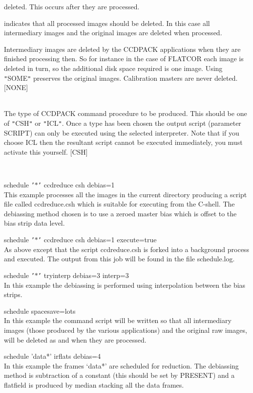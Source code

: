 \documentclass[twoside,11pt]{article}
\newcommand{\htmlref}[2]{#1}
\renewcommand{\_}{\texttt{\symbol{95}}}
\newcommand{\qt}[1]{{\tt "}#1{\tt "}}
\newcommand{\qs}[1]{{\tt '}#1{\tt '}}
\newcommand{\xroutine}[1]{\htmlref{{\sc #1}}{#1}}
\newcommand{\sstexamples}[1]{
   \item[Examples:] \mbox{} \\
   \vspace{-3.5ex}
   \begin{description}
      #1
   \end{description}
}
\newcommand{\sstsubsection}[1]{ \item[{#1}] \mbox{} \\}
\newcommand{\sstexamplesubsection}[2]{\sloppy \item{\ssttt #1} \mbox{} \\ #2 }
\newcommand{\sstexamples}[1]{
      \item[Examples:] \\
      \begin{description}
         #1
      \end{description}
      \\
   }
\newcommand{\sstsubsection}[1]{\item[{#1}]}
\newcommand{\sstexamplesubsection}[2]{\item[{\ssttt #1}] #2}
\begin{document}
{{{\begin{description}
                   deleted. This occurs after they are processed.
            \item[\qt{LOTS}] indicates that all processed images should be deleted.
                   In this case all intermediary images and the original
                   images are deleted when processed.
         \end{description}
         Intermediary images are deleted by the CCDPACK applications when
         they are finished processing then. So for instance in the case
         of \xroutine{FLATCOR} each image is deleted in turn, so the additional disk
         space required is one image. Using \qt{SOME} preserves the original
         images. Calibration masters are never deleted.
         [NONE]
      }
      \sstsubsection{
         STYPE = LITERAL (Read)
      }{
         The type of CCDPACK command procedure to be produced. This
         should be one of \qt{CSH} or \qt{ICL}. Once a type has been
         chosen the output script (parameter SCRIPT) can only be
         executed using the selected interpreter. Note that if you
         choose ICL then the resultant script cannot be executed
         immediately, you must activate this yourself.
         [CSH]
      }
   }
   \sstexamples{
      \sstexamplesubsection{
         schedule \qs{$*$} ccdreduce csh debias=1
      }{
         This example processes all the images in the current directory
         producing a script file called ccdreduce.csh which is suitable
         for executing from the C-shell. The debiassing method chosen is
         to use a zeroed master bias which is offset to the bias strip
         data level.
      }
      \sstexamplesubsection{
         schedule \qs{$*$} ccdreduce csh debias=1 execute=true
      }{
         As above except that the script ccdreduce.csh is forked into a
         background process and executed. The output from this job will
         be found in the file schedule.log.
      }
      \sstexamplesubsection{
         schedule \qs{$*$} tryinterp debias=3 interp=3
      }{
         In this example the debiassing is performed using interpolation
         between the bias strips.
      }
      \sstexamplesubsection{
         schedule spacesave=lots
      }{
         In this example the command script will be written so that all
         intermediary images (those produced by the various applications)
         and the original raw images, will be deleted as and when they are
         processed.
      }
      \sstexamplesubsection{
         schedule 'data*' irflats debias=4
      } {
         In this example the frames `data*' are scheduled for reduction.
         The debiassing method is subtraction of a constant (this should
         be set by \xroutine{PRESENT}) and a flatfield is produced by
         median stacking all the data frames.
      }
   }
}
\end{document}

